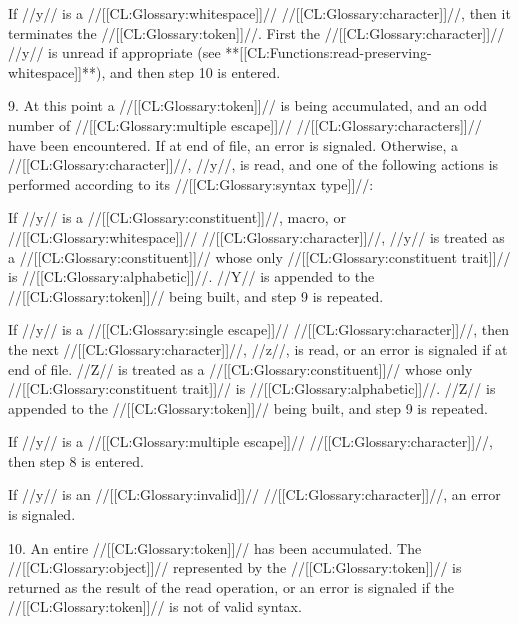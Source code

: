 \itemitem{\bull}
If //y// is a //[[CL:Glossary:whitespace]]// //[[CL:Glossary:character]]//, then it terminates
the //[[CL:Glossary:token]]//.  First the //[[CL:Glossary:character]]// //y// is unread
if appropriate (see **[[CL:Functions:read-preserving-whitespace]]**),
and then step 10 is entered.
\endlist



\item{9.}
At this point a //[[CL:Glossary:token]]// is being accumulated, and an odd number
of //[[CL:Glossary:multiple escape]]// //[[CL:Glossary:characters]]// have been encountered.
If at end of file, an error  is signaled.
Otherwise, a //[[CL:Glossary:character]]//, //y//, is read, and
one of the following actions is performed according to its //[[CL:Glossary:syntax type]]//:


\beginlist
\itemitem{\bull}
If //y// is a //[[CL:Glossary:constituent]]//, macro, or //[[CL:Glossary:whitespace]]// //[[CL:Glossary:character]]//,
//y// is treated as a //[[CL:Glossary:constituent]]// 
whose only //[[CL:Glossary:constituent trait]]// is //[[CL:Glossary:alphabetic]]//.             
//Y// is appended to the //[[CL:Glossary:token]]// being built, and step 9 is repeated.


\itemitem{\bull}
If //y// is a //[[CL:Glossary:single escape]]// //[[CL:Glossary:character]]//, then the next //[[CL:Glossary:character]]//,
//z//, is read, or an error  is signaled if at end of file.
//Z// is treated as a //[[CL:Glossary:constituent]]//
whose only //[[CL:Glossary:constituent trait]]// is //[[CL:Glossary:alphabetic]]//.
//Z// is appended to the //[[CL:Glossary:token]]// being built,
and step 9 is repeated.


\itemitem{\bull}
If //y// is a //[[CL:Glossary:multiple escape]]// //[[CL:Glossary:character]]//,
then step 8 is entered.


\itemitem{\bull}
If //y// is an //[[CL:Glossary:invalid]]// //[[CL:Glossary:character]]//,
an error  is signaled.
\endlist


\item{10.}
An entire //[[CL:Glossary:token]]// has been accumulated.
The //[[CL:Glossary:object]]// represented by the //[[CL:Glossary:token]]// is returned 
as the result of the read operation,
or an error  is signaled if the //[[CL:Glossary:token]]// is not of valid syntax.
\endlist












